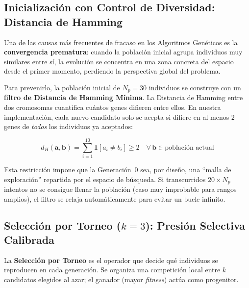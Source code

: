 \documentclass[12pt, a4paper]{article}
\begin{document}
\subsection{Inicialización con Control de Diversidad: Distancia de Hamming}

Una de las causas más frecuentes de fracaso en los Algoritmos Genéticos es la
\textbf{convergencia prematura}: cuando la población inicial agrupa individuos muy
similares entre sí, la evolución se concentra en una zona concreta del espacio
desde el primer momento, perdiendo la perspectiva global del problema.

Para prevenirlo, la población inicial de $N_p = 30$ individuos se construye con un
\textbf{filtro de Distancia de Hamming Mínima}. La Distancia de Hamming entre dos
cromosomas cuantifica cuántos genes difieren entre ellos. En nuestra implementación,
cada nuevo candidato solo se acepta si difiere en al menos 2 genes de
\textit{todos} los individuos ya aceptados:

\begin{equation}
  d_H(\mathbf{a}, \mathbf{b}) = \sum_{i=1}^{10} \mathbf{1}[a_i \neq b_i] \geq 2
  \quad \forall \, \mathbf{b} \in \text{población actual}
\end{equation}

Esta restricción impone que la Generación~0 sea, por diseño, una ``malla de exploración''
repartida por el espacio de búsqueda. Si transcurridos $20 \times N_p$ intentos no se
consigue llenar la población (caso muy improbable para rangos amplios), el filtro se
relaja automáticamente para evitar un bucle infinito.

\subsection{Selección por Torneo ($k=3$): Presión Selectiva Calibrada}

La \textbf{Selección por Torneo} es el operador que decide qué individuos se reproducen
en cada generación. Se organiza una competición local entre $k$ candidatos elegidos al
azar; el ganador (mayor \textit{fitness}) actúa como progenitor.
\end{document}
